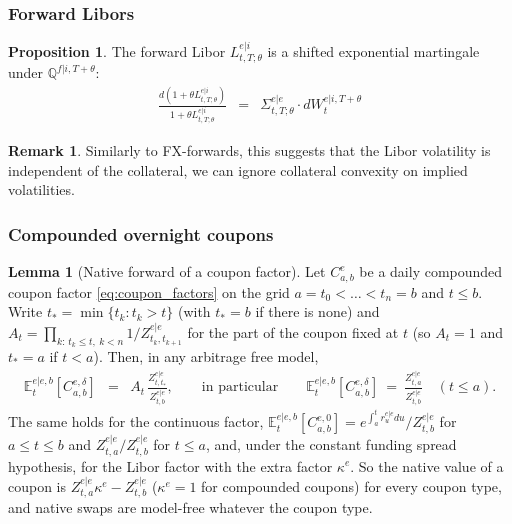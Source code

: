 \documentclass[11pt,english]{amsart}
\newcommand{\EE}{\mathbb{E}}
\newcommand{\QQ}{\mathbb{Q}}
\theoremstyle{definition}
\newtheorem{prop}{Proposition}
\newtheorem{lemm}{Lemma}
\newtheorem{rema}{Remark}
\begin{document}
\subsubsection{Forward Libors}

\begin{prop}
The forward Libor $L^{e|i}_{t,T;\theta}$ is a shifted exponential martingale under $\QQ^{f|i,T+\theta}$: 
\begin{eqnarray}
  \frac{d (1+\theta L^{e|i}_{t,T;\theta})}{1+\theta L^{e|i}_{t,T;\theta}}  
  &=&   \Sigma^{e|e}_{t,T;\theta}  \cdot  dW^{e|i,T+\theta}_t  
\end{eqnarray} 
\end{prop}

\begin{rema}
Similarly to FX-forwards, this suggests that the Libor volatility is independent of the collateral, we can ignore collateral convexity on implied volatilities.
\end{rema}


\subsubsection{Compounded overnight coupons}

\begin{lemm}[Native forward of a coupon factor]\label{lemm:coupon_native_forward}
Let $C^e_{a,b}$ be a daily compounded coupon factor \eqref{eq:coupon_factors} on the grid $a = t_0<\ldots<t_n = b$ and $t\le b$. Write $t_* = \min\{t_k : t_k > t\}$ (with $t_* = b$ if there is none) and $A_t = \prod_{k:\,t_k\le t,\ k<n} 1/Z^{e|e}_{t_k,t_{k+1}}$ for the part of the coupon fixed at $t$ (so $A_t = 1$ and $t_* = a$ if $t<a$). Then, in any arbitrage free model,
\begin{eqnarray}
  \EE^{e|e,b}_t\left[C^{e,\delta}_{a,b}\right] &=& A_t\,\frac{Z^{e|e}_{t,t_*}}{Z^{e|e}_{t,b}} , \qquad\textrm{in particular}\qquad
  \EE^{e|e,b}_t\left[C^{e,\delta}_{a,b}\right] ~=~ \frac{Z^{e|e}_{t,a}}{Z^{e|e}_{t,b}} \quad (t\le a).
  \label{eq:coupon_native_forward}
\end{eqnarray}
The same holds for the continuous factor, $\EE^{e|e,b}_t[C^{e,0}_{a,b}] = e^{\int_a^{t}r^{e|e}_udu}/Z^{e|e}_{t,b}$ for $a\le t\le b$ and $Z^{e|e}_{t,a}/Z^{e|e}_{t,b}$ for $t\le a$, and, under the constant funding spread hypothesis, for the Libor factor with the extra factor $\kappa^e$. So the native value of a coupon is $Z^{e|e}_{t,a}\kappa^e - Z^{e|e}_{t,b}$ ($\kappa^e = 1$ for compounded coupons) for every coupon type, and native swaps are model-free whatever the coupon type.
\end{lemm}
\end{document}
